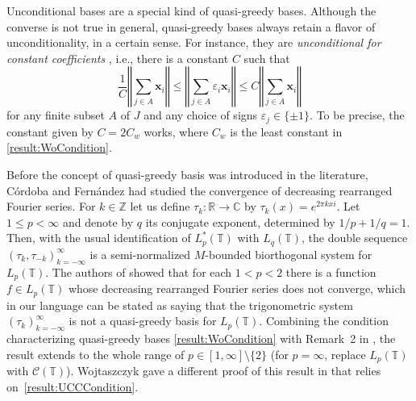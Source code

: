 \documentclass[11pt, leqno]{amsart}
\theoremstyle{remark}
\numberwithin{equation}{section}
\newcommand{\ZZ}{\ensuremath{\mathbb{Z}}}
\newcommand{\RR}{\ensuremath{\mathbb{R}}}
\newcommand{\TT}{\ensuremath{\mathbb{T}}}
\newcommand{\CC}{\ensuremath{\mathbb{C}}}
\newcommand{\Cont}{\ensuremath{\mathcal{C}}}
\newcommand{\xx}{\ensuremath{\mathbf{x}}}
\begin{document}
Unconditional bases are a special kind of quasi-greedy bases. Although the converse is not true in general, quasi-greedy bases always retain a flavor of unconditionality,  in a certain sense. For instance, they are \textit{unconditional for constant coefficients} \cite{Wo2000}, i.e., there is a constant $C$  such that
\begin{equation}
\label{result:UCCCondition}
 \frac{1}{C}\left\Vert \sum_{j\in A} \xx_{i}\right\Vert\le \left\Vert \sum_{j\in A}\varepsilon_{i} \xx_{i}\right\Vert\le C \left\Vert \sum_{j\in A} \xx_{i}\right\Vert
\end{equation}
for any finite subset $A$ of $J$ and any choice of signs $\varepsilon_j\in\{\pm1\}$. To be precise, the constant given by $C=2 C_{w}$ works, where $C_{w}$ is the least constant in \eqref{result:WoCondition}.

Before the concept of quasi-greedy basis was introduced in the literature, C\'or\-do\-ba and Fer\-n\'an\-dez \cite{CoFe1998} had studied the convergence of decreasing rearranged Fourier series. For $k\in\ZZ$ let us define $\tau_k\colon\RR\to\CC$ by $\tau_k(x)=e^{2\pi k x i}$. Let $1\le p<\infty$ and denote by $q$ its conjugate exponent, determined by
$1/p+1/q=1$. Then, with the usual identification of  $L_p^*(\TT)$ with $L_q(\TT)$, the double sequence $(\tau_k,\tau_{-k})_{k=-\infty}^\infty$ is a semi-normalized $M$-bounded biorthogonal system for $L_p(\TT)$. The authors of \cite{CoFe1998} showed that for each $1<p<2$ there is a function $f\in L_p(\TT)$ whose decreasing rearranged Fourier series does not converge, which in our language can be stated as saying that  the trigonometric system $(\tau_k)_{k=-\infty}^\infty$ is not a quasi-greedy basis for $L_p(\TT)$.
Combining the condition characterizing quasi-greedy bases \eqref{result:WoCondition} with Remark~2 in \cite{Telmyakov1998}, the result extends to the whole range of $p\in[1,\infty]\setminus\{2\}$ (for $p=\infty$, replace $L_p(\TT)$ with $\Cont(\TT)$).
Wojtaszczyk gave a different proof of this result in \cite{Wo2000} that relies on~\eqref{result:UCCCondition}.
\end{document}
